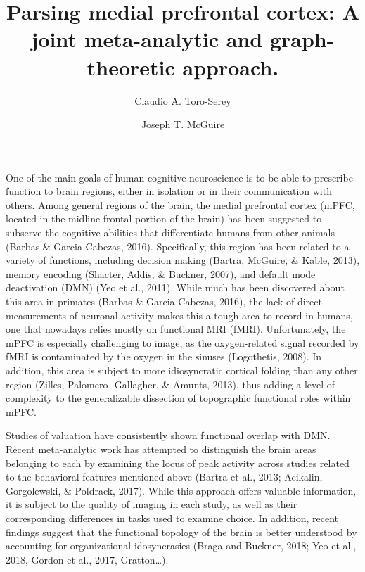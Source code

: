 \documentclass[9pt,twocolumn,twoside,]{pnas-new}
\title{Parsing medial prefrontal cortex: A joint meta-analytic and
graph-theoretic approach.}
\author[a,1,2]{Claudio A. Toro-Serey}
\author[a,1]{Joseph T. McGuire}
\affil[a]{Boston University, Department of Psychological and Brain Sciences, 64
Commonwealth Ave., Boston, 02250}
\begin{document}
\verticaladjustment{-2pt}

\maketitle
\thispagestyle{firststyle}



One of the main goals of human cognitive neuroscience is to be able to
prescribe function to brain regions, either in isolation or in their
communication with others. Among general regions of the brain, the
medial prefrontal cortex (mPFC, located in the midline frontal portion
of the brain) has been suggested to subserve the cognitive abilities
that differentiate humans from other animals (Barbas \& Garcia-Cabezas,
2016). Specifically, this region has been related to a variety of
functions, including decision making (Bartra, McGuire, \& Kable, 2013),
memory encoding (Shacter, Addis, \& Buckner, 2007), and default mode
deactivation (DMN) (Yeo et al., 2011). While much has been discovered
about this area in primates (Barbas \& Garcia-Cabezas, 2016), the lack
of direct measurements of neuronal activity makes this a tough area to
record in humans, one that nowadays relies mostly on functional MRI
(fMRI). Unfortunately, the mPFC is especially challenging to image, as
the oxygen-related signal recorded by fMRI is contaminated by the oxygen
in the sinuses (Logothetis, 2008). In addition, this area is subject to
more idiosyncratic cortical folding than any other region (Zilles,
Palomero- Gallagher, \& Amunts, 2013), thus adding a level of complexity
to the generalizable dissection of topographic functional roles within
mPFC.

Studies of valuation have consistently shown functional overlap with
DMN. Recent meta-analytic work has attempted to distinguish the brain
areas belonging to each by examining the locus of peak activity across
studies related to the behavioral features mentioned above (Bartra et
al., 2013; Acikalin, Gorgolewski, \& Poldrack, 2017). While this
approach offers valuable information, it is subject to the quality of
imaging in each study, as well as their corresponding differences in
tasks used to examine choice. In addition, recent findings suggest that
the functional topology of the brain is better understood by accounting
for organizational idosyncrasies (Braga and Buckner, 2018; Yeo et al.,
2018, Gordon et al., 2017, Gratton\ldots{}).
\end{document}
